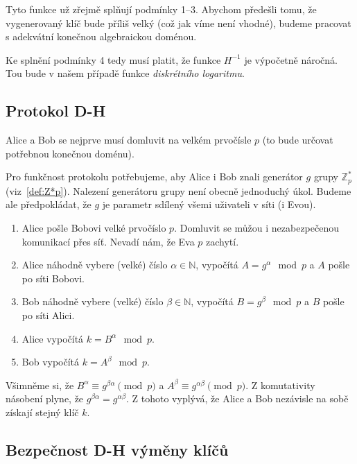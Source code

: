 \documentclass[12pt]{article}
\begin{document}
    Tyto funkce už zřejmě splňují podmínky 1--3. Abychom předešli tomu, že vygenerovaný klíč bude příliš velký
    (což jak víme není vhodné), budeme pracovat s adekvátní konečnou algebraickou doménou.

    Ke splnění podmínky 4 tedy musí platit, že funkce $H^{-1}$ je výpočetně náročná.
    Tou bude v našem případě funkce \emph{diskrétního logaritmu}.


    \subsection{Protokol D-H}


        Alice a Bob se nejprve musí domluvit na velkém prvočísle $p$ (to bude určovat potřebnou konečnou doménu).

        Pro funkčnost protokolu potřebujeme, aby Alice i Bob znali generátor $g$ grupy $\mathbb{Z}^*_p$ (viz~\ref{def:Z*p}).
        Nalezení generátoru grupy není obecně jednoduchý úkol. Budeme ale předpokládat, že $g$ je parametr sdílený všemi uživateli v síti (i Evou).

        \begin{enumerate}
            \item
                Alice pošle Bobovi velké prvočíslo $p$.
                Domluvit se můžou i nezabezpečenou komunikací přes síť. Nevadí nám, že Eva $p$ zachytí.
            \item
                Alice náhodně vybere (velké) číslo $\alpha \in \mathbb{N}$, vypočítá $A=g^\alpha \mod{p}$ a $A$ pošle po síti Bobovi.
            \item
                Bob náhodně vybere (velké) číslo $\beta \in \mathbb{N}$, vypočítá $B=g^\beta \mod{p}$ a $B$ pošle po síti Alici.
            \item
                Alice vypočítá $k=B^\alpha \mod{p}$.
            \item
                Bob vypočítá $k=A^\beta \mod{p}$.

        \end{enumerate}

        Všimněme si, že $B^\alpha \equiv g^{\beta \alpha} \pmod{p}$ a $A^\beta \equiv g^{\alpha \beta} \pmod{p}$. Z komutativity násobení
        plyne, že $g^{\beta \alpha} = g^{\alpha \beta}$. Z tohoto vyplývá, že Alice a Bob nezávisle na sobě získají stejný klíč $k$.


    \subsection{Bezpečnost D-H výměny klíčů}\label{subsec:diffie-hellman-safety}
\end{document}
